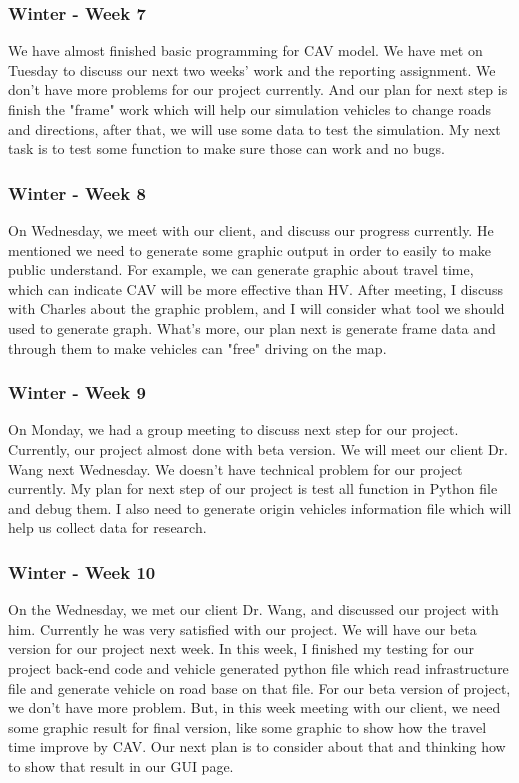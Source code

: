 \documentclass[onecolumn, draftclsnofoot,10pt, compsoc]{IEEEtran}
\begin{document}
\subsubsection{Winter - Week 7}
We have almost finished basic programming for CAV model.
We have met on Tuesday to discuss our next two weeks' work and the reporting assignment.
We don't have more problems for our project currently.
And our plan for next step is finish the "frame" work which will help our simulation vehicles to change roads and directions, after that, we will use some data to test the simulation.
My next task is to test some function to make sure those can work and no bugs.
\subsubsection{Winter - Week 8}
On Wednesday, we meet with our client, and discuss our progress currently.
He mentioned we need to generate some graphic output in order to easily to make public understand.
For example, we can generate graphic about travel time, which can indicate CAV will be more effective than HV.
After meeting, I discuss with Charles about the graphic problem, and I will consider what tool we should used to generate graph.
What's more, our plan next is generate frame data and through them to make vehicles can "free" driving on the map.
\subsubsection{Winter - Week 9}
On Monday, we had a group meeting to discuss next step for our project.
Currently, our project almost done with beta version.
We will meet our client Dr. Wang next Wednesday.
We doesn't have technical problem for our project currently.
My plan for next step of our project is test all function in Python file and debug them.
I also need to generate origin vehicles information file which will help us collect data for research.
\subsubsection{Winter - Week 10}
On the Wednesday, we met our client Dr. Wang, and discussed our project with him.
Currently he was very satisfied with our project.
We will have our beta version for our project next week.
In this week, I finished my testing for our project back-end code and vehicle generated python file which read infrastructure file and generate vehicle on road base on that file.
For our beta version of project, we don't have more problem.
But, in this week meeting with our client, we need some graphic result for final version, like some graphic to show how the travel time improve by CAV.
Our next plan is to consider about that and thinking how to show that result in our GUI page.
\end{document}
